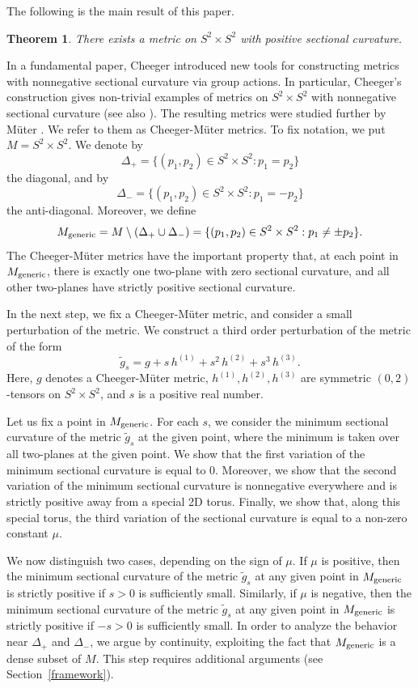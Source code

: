 \documentclass[11pt]{amsart}
\newtheorem{theorem}{Theorem}[section]
\theoremstyle{definition}
\begin{document}
The following is the main result of this paper.

\begin{theorem}
\label{main.theorem}
There exists a metric on $S^2 \times S^2$ with positive sectional curvature. 
\end{theorem}

In a fundamental paper, Cheeger \cite{Cheeger} introduced new tools for constructing metrics with nonnegative sectional curvature via group actions. In particular, Cheeger's construction gives non-trivial examples of metrics on $S^2 \times S^2$ with nonnegative sectional curvature (see also \cite{Bourguignon}). The resulting metrics were studied further by M\"uter \cite{Mueter}. We refer to them as Cheeger-M\"uter metrics. To fix notation, we put $M = S^2 \times S^2$. We denote by 
\[\Delta_+ = \{(p_1,p_2) \in S^2 \times S^2: p_1 = p_2\}\] 
the diagonal, and by 
\[\Delta_- = \{(p_1,p_2) \in S^2 \times S^2: p_1 = -p_2\}\] 
the anti-diagonal. Moreover, we define 
\[M_{\text{\rm generic}} = M \setminus (\Delta_+ \cup \Delta_-) = \{(p_1,p_2) \in S^2 \times S^2: p_1 \neq \pm p_2\}.\] The Cheeger-M\"uter metrics have the important property that, at each point in $M_{\text{\rm generic}}$, there is exactly one two-plane with zero sectional curvature, and all other two-planes have strictly positive sectional curvature.

In the next step, we fix a Cheeger-M\"uter metric, and consider a small perturbation of the metric. We construct a third order perturbation of the metric of the form 
\[\tilde{g}_s = g + s \, h^{(1)} + s^2 \, h^{(2)} + s^3 \, h^{(3)}.\] 
Here, $g$ denotes a Cheeger-M\"uter metric, $h^{(1)}, h^{(2)}, h^{(3)}$ are symmetric $(0,2)$-tensors on $S^2 \times S^2$, and $s$ is a positive real number. 

Let us fix a point in $M_{\text{\rm generic}}$. For each $s$, we consider the minimum sectional curvature of the metric $\tilde{g}_s$ at the given point, where the minimum is taken over all two-planes at the given point. We show that the first variation of the minimum sectional curvature is equal to $0$. Moreover, we show that the second variation of the minimum sectional curvature is nonnegative everywhere and is strictly positive away from a special 2D torus. Finally, we show that, along this special torus, the third variation of the sectional curvature is equal to a non-zero constant $\mu$. 

We now distinguish two cases, depending on the sign of $\mu$. If $\mu$ is positive, then the minimum sectional curvature of the metric $\tilde{g}_s$ at any given point in $M_{\text{\rm generic}}$ is strictly positive if $s > 0$ is sufficiently small. Similarly, if $\mu$ is negative, then the minimum sectional curvature of the metric $\tilde{g}_s$ at any given point in $M_{\text{\rm generic}}$ is strictly positive if $-s > 0$ is sufficiently small. In order to analyze the behavior near $\Delta_+$ and $\Delta_-$, we argue by continuity, exploiting the fact that $M_{\text{\rm generic}}$ is a dense subset of $M$. This step requires additional arguments (see Section~\ref{framework}).
\end{document}
